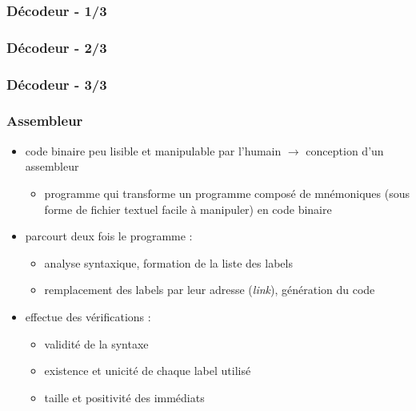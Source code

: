 \documentclass{beamer}
\begin{document}
\begin{frame}[fragile]
\frametitle{Décodeur - 1/3}

\end{frame}
\begin{frame}[fragile]
\frametitle{Décodeur - 2/3}

\end{frame}
\begin{frame}[fragile]
\frametitle{Décodeur - 3/3}

\end{frame}

\begin{frame}
\frametitle{Assembleur}
\begin{itemize}
\item code binaire peu lisible et manipulable par l'humain $\rightarrow$
    conception d'un assembleur
    \begin{itemize}
    \item programme qui transforme un programme composé de mnémoniques (sous
        forme de fichier textuel facile à manipuler) en code binaire
    \end{itemize}
\item parcourt deux fois le programme :
    \begin{itemize}
    \item analyse syntaxique, formation de la liste des labels
    \item remplacement des labels par leur adresse (\textit{link}), génération
        du code
    \end{itemize}
\item effectue des vérifications :
    \begin{itemize}
    \item validité de la syntaxe
    \item existence et unicité de chaque label utilisé
    \item taille et positivité des immédiats
    \end{itemize}
\end{itemize}
\end{frame}
\end{document}
